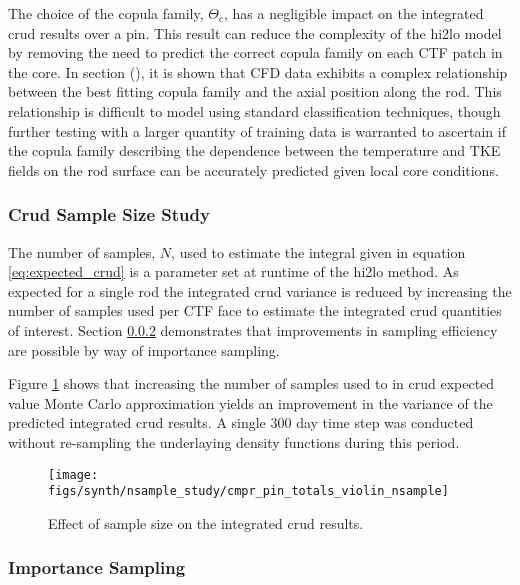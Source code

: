 The choice of the copula family, $\Theta_c$, has a negligible impact on the integrated crud results over a pin.  This result can reduce the complexity of the hi2lo model by removing the need to predict the correct copula family on each CTF patch in the core.  In section (), it is shown that CFD data exhibits a complex relationship between the best fitting copula family and the axial position along the rod.  This relationship is difficult to model using standard classification techniques, though further testing with a larger quantity of training data is warranted to ascertain if the copula family describing the dependence between the temperature and TKE fields on the rod surface can be accurately predicted given local core conditions.

\subsubsection{Crud Sample Size Study}

The number of samples, $N$, used to estimate the integral given in equation \ref{eq:expected_crud} is a parameter set at runtime of the hi2lo method.
As expected for a single rod the integrated crud variance is reduced by increasing the number of samples used per CTF face to estimate the integrated crud quantities of interest.   Section \ref{sec:Importance Sampling} demonstrates that improvements in sampling efficiency are possible by way of importance sampling.

Figure \ref{fig:cmprpintotalsviolinnsample} shows that increasing the number of samples used to in crud expected value Monte Carlo approximation yields an improvement in the variance of the predicted integrated crud results.  A single 300 day time step was conducted without re-sampling the underlaying density functions during this period.

\begin{figure}[H]
    \centering
    \texttt{[image: figs/synth/nsample\_study/cmpr\_pin\_totals\_violin\_nsample]}
    \caption{Effect of sample size on the integrated crud results.}
    \label{fig:cmprpintotalsviolinnsample}
\end{figure}



\subsubsection{Importance Sampling}
\label{sec:Importance Sampling}

